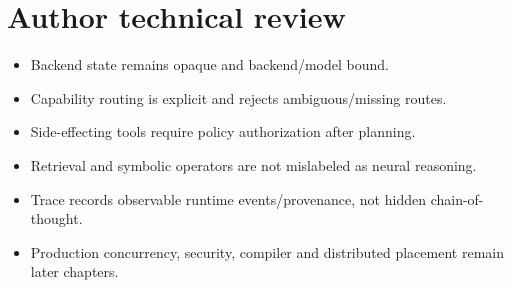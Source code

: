 \chapter*{Author technical review}
\begin{itemize}
\item Backend state remains opaque and backend/model bound.
\item Capability routing is explicit and rejects ambiguous/missing routes.
\item Side-effecting tools require policy authorization after planning.
\item Retrieval and symbolic operators are not mislabeled as neural reasoning.
\item Trace records observable runtime events/provenance, not hidden chain-of-thought.
\item Production concurrency, security, compiler and distributed placement remain later chapters.
\end{itemize}
